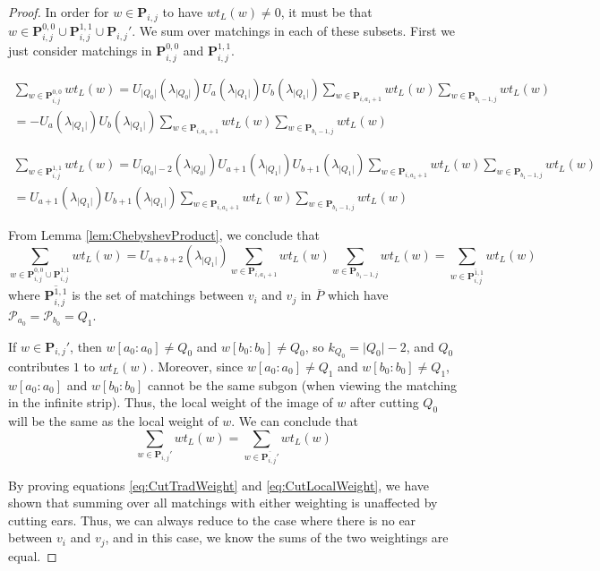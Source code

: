\documentclass[12pt]{article}
\theoremstyle{remark}
\newcommand*{\pathset}[2]{\mathbf{P}_{#1,#2}}
\newcommand*{\poly}[1]{\mathcal{P}_{#1}}
\begin{document}
\begin{proof}
In order for $w \in \pathset{i}{j}$ to have $wt_L(w) \neq 0$, it must be that $w \in \pathset{i}{j}^{0,0} \cup \pathset{i}{j}^{1,1} \cup \pathset{i}{j}'$. We sum over matchings in each of these subsets. First we just consider matchings in $\pathset{i}{j}^{0,0}$ and $\pathset{i}{j}^{1,1}$.  

\begin{align*}
\sum_{w \in \pathset{i}{j}^{0,0}} wt_L(w) = U_{\vert Q_0 \vert}(\lambda_{\vert Q_0 \vert}) U_a(\lambda_{\vert Q_1 \vert})U_b(\lambda_{\vert Q_1 \vert})\sum_{w \in \pathset{i}{a_1+1}} wt_L(w) \sum_{w \in \pathset{b_1-1}{j}} wt_L(w)\\
= -U_a(\lambda_{\vert Q_1 \vert})U_b(\lambda_{\vert Q_1 \vert})\sum_{w \in \pathset{i}{a_1+1}} wt_L(w) \sum_{w \in \pathset{b_1-1}{j}} wt_L(w)
\end{align*}

\begin{align*}
\sum_{w \in \pathset{i}{j}^{1,1}} wt_L(w) = U_{\vert Q_0 \vert - 2 }(\lambda_{\vert Q_0 \vert}) U_{a+1}(\lambda_{\vert Q_1 \vert})U_{b+1}(\lambda_{\vert Q_1 \vert})\sum_{w \in \pathset{i}{a_1+1}} wt_L(w) \sum_{w \in \pathset{b_1-1}{j}} wt_L(w)\\
= U_{a+1}(\lambda_{\vert Q_1 \vert})U_{b+1}(\lambda_{\vert Q_1 \vert})\sum_{w \in \pathset{i}{a_1+1}} wt_L(w) \sum_{w \in \pathset{b_1-1}{j}} wt_L(w)
\end{align*}

From Lemma \ref{lem:ChebyshevProduct}, we conclude that \[
\sum_{w \in \pathset{i}{j}^{0,0} \cup \pathset{i}{j}^{1,1}} wt_L(w) = U_{a+b+2}(\lambda_{\vert Q_1 \vert})\sum_{w \in \pathset{i}{a_1+1}} wt_L(w) \sum_{w \in \pathset{b_1-1}{j}} wt_L(w) = \sum_{w \in \overline{\pathset{i}{j}^{1,1}}} wt_L(w)
\]
where $\overline{\pathset{i}{j}^{1,1}}$ is the set of matchings between $v_i$ and $v_j$ in $\overline{P}$ which have $\poly{a_0} = \poly{b_0} = Q_1$. 

If $w \in \pathset{i}{j}'$, then $w[a_0:a_0] \neq Q_0$ and $w[b_0:b_0] \neq Q_0$, so $k_{Q_0} = \vert Q_0 \vert - 2$, and $Q_0$ contributes $1$ to $wt_L(w)$. Moreover, since $w[a_0:a_0] \neq Q_1$ and $w[b_0:b_0] \neq Q_1$, $w[a_0:a_0]$ and $w[b_0:b_0]$ cannot be the same subgon (when viewing the matching in the infinite strip). Thus, the local weight of the image of $w$ after cutting $Q_0$ will be the same as the local weight of $w$. We can conclude that \[
\sum_{w \in \pathset{i}{j}'} wt_L(w) = \sum_{w \in \overline{\pathset{i}{j}'}} wt_L(w)
\]

By proving equations \ref{eq:CutTradWeight} and \ref{eq:CutLocalWeight}, we have shown that summing over all matchings with either weighting is unaffected by cutting ears. Thus, we can always reduce to the case where there is no ear between $v_i$ and $v_j$, and in this case, we know the sums of the two weightings are equal. 
\end{proof}
\end{document}
